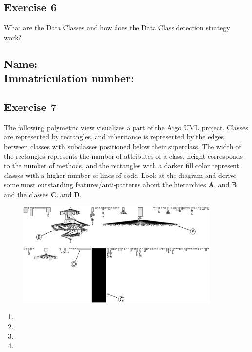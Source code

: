 \documentclass [11pt, a4wide, twoside]{article}
\begin{document}
\subsection*{Exercise 6}
What are the Data Classes and how does the Data Class detection strategy work?
\vspace{4cm}



\subsection*{Name: \\ Immatriculation number:}

\subsection*{Exercise 7}
The following polymetric view visualizes a part of the Argo UML project. Classes are represented by rectangles, and inheritance is represented by the edges between classes with subclasses positioned below their superclass. The width of the rectangles represents the number of attributes of a class, height corresponds to the number of methods, and the rectangles with a darker fill color represent classes with a higher number of lines of code. Look at the diagram and derive some most outstanding features/anti-patterns about the hierarchies \textbf{A}, and \textbf{B} and the classes \textbf{C}, and \textbf{D}.

\begin{figure}[h!]
  \centering
  \includegraphics[width=0.9\textwidth]{argo-viz}
\end{figure}
\begin{enumerate}[label=(\Alph*)]
\item 
\item \vspace{1cm}
\item \vspace{1cm}
\item \vspace{1cm}
\end{enumerate}
\vspace{1cm}
\end{document}
